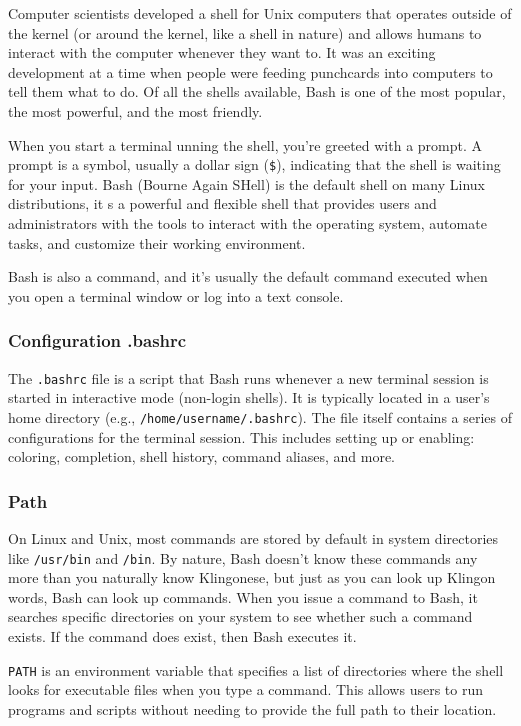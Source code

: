 \documentclass{article}
\begin{document}
Computer scientists developed a shell for Unix computers that operates outside of the kernel (or around the kernel, like a shell in nature) and allows humans to interact with the computer whenever they want to. It was an exciting development at a time when people were feeding punchcards into computers to tell them what to do. Of all the shells available, Bash is one of the most popular, the most powerful, and the most friendly.

When you start a terminal unning the shell, you're greeted with a prompt. A prompt is a symbol, usually a dollar sign (\verb|$|), indicating that the shell is waiting for your input. 
Bash (Bourne Again SHell) is the default shell on many Linux distributions, it s a powerful and flexible shell that provides users and administrators with the tools to interact with the operating system, automate tasks, and customize their working environment.

Bash is also a command, and it's usually the default command executed when you open a terminal window or log into a text console.

\subsubsection{Configuration .bashrc}
The \verb|.bashrc| file is a script that Bash runs whenever a new terminal session is started in interactive mode (non-login shells). It is typically located in a user's home directory (e.g., \verb|/home/username/.bashrc|).
The file itself contains a series of configurations for the terminal session. This includes setting up or enabling: coloring, completion, shell history, command aliases, and more.

\subsubsection{Path}
On Linux and Unix, most commands are stored by default in system directories like \verb|/usr/bin| and \verb|/bin|. By nature, Bash doesn't know these commands any more than you naturally know Klingonese, but just as you can look up Klingon words, Bash can look up commands. When you issue a command to Bash, it searches specific directories on your system to see whether such a command exists. If the command does exist, then Bash executes it.

\verb|PATH| is an environment variable that specifies a list of directories where the shell looks for executable files when you type a command. This allows users to run programs and scripts without needing to provide the full path to their location.
\end{document}
